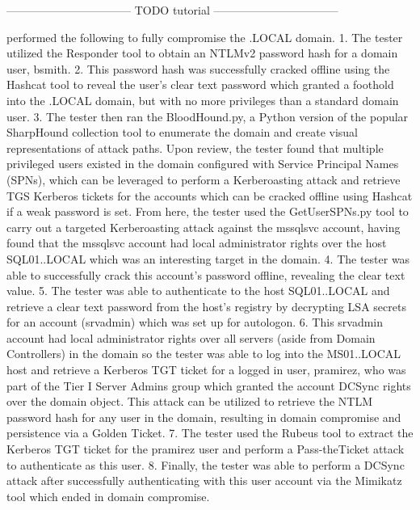---------------------------------
TODO tutorial
---------------------------------


\qquad \brandName performed the following to fully compromise the \enterpriseName.LOCAL domain.
1. The tester utilized the Responder tool to obtain an NTLMv2 password hash for a domain user, bsmith.
2. This password hash was successfully cracked offline using the Hashcat tool to reveal the user's clear text
password which granted a foothold into the \enterpriseName.LOCAL domain, but with no more privileges than
a standard domain user.
3. The tester then ran the BloodHound.py, a Python version of the popular SharpHound collection tool to
enumerate the domain and create visual representations of attack paths. Upon review, the tester found that
multiple privileged users existed in the domain configured with Service Principal Names (SPNs), which can be
leveraged to perform a Kerberoasting attack and retrieve TGS Kerberos tickets for the accounts which can be
cracked offline using Hashcat if a weak password is set. From here, the tester used the GetUserSPNs.py tool to
carry out a targeted Kerberoasting attack against the mssqlsvc account, having found that the mssqlsvc account
had local administrator rights over the host SQL01.\enterpriseName.LOCAL which was an interesting target in
the domain.
4. The tester was able to successfully crack this account's password offline, revealing the clear text value.
5. The tester was able to authenticate to the host SQL01.\enterpriseName.LOCAL and retrieve a clear text
password from the host's registry by decrypting LSA secrets for an account (srvadmin) which was set up for
autologon.
6. This srvadmin account had local administrator rights over all servers (aside from Domain Controllers) in the
domain so the tester was able to log into the MS01.\enterpriseName.LOCAL host and retrieve a Kerberos TGT
ticket for a logged in user, pramirez, who was part of the Tier I Server Admins group which granted the account
DCSync rights over the domain object. This attack can be utilized to retrieve the NTLM password hash for any
user in the domain, resulting in domain compromise and persistence via a Golden Ticket.
7. The tester used the Rubeus tool to extract the Kerberos TGT ticket for the pramirez user and perform a Pass-theTicket attack to authenticate as this user.
8. Finally, the tester was able to perform a DCSync attack after successfully authenticating with this user account
via the Mimikatz tool which ended in domain compromise.

